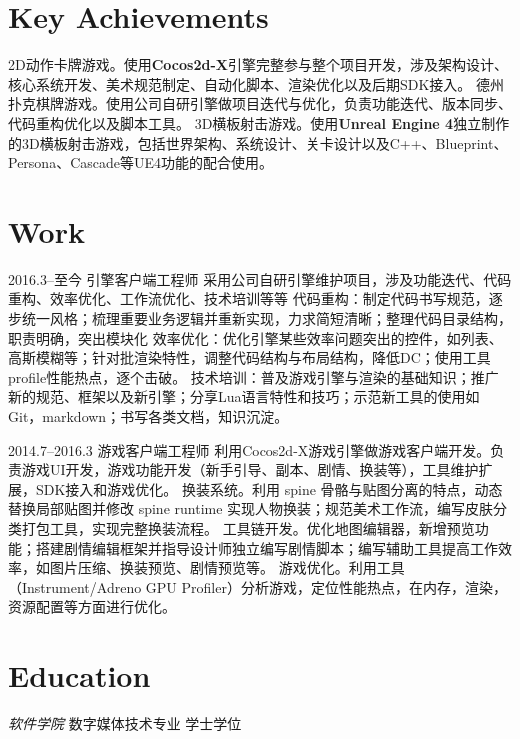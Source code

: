 \documentclass[full]{rvca}
\begin{document}
\subsection{}

\section{Key Achievements}

\achievements
{2D动作卡牌游戏。使用\textbf{Cocos2d-X}引擎完整参与整个项目开发，涉及架构设计、核心系统开发、美术规范制定、自动化脚本、渲染优化以及后期SDK接入。}
{德州扑克棋牌游戏。使用公司自研引擎做项目迭代与优化，负责功能迭代、版本同步、代码重构优化以及脚本工具。}
{3D横板射击游戏。使用\textbf{Unreal Engine 4}独立制作的3D横板射击游戏，包括世界架构、系统设计、关卡设计以及C++、Blueprint、Persona、Cascade等UE4功能的配合使用。}
{}

\section{Work}

{2016.3--至今}
{引擎客户端工程师}
{采用公司自研引擎维护项目，涉及功能迭代、代码重构、效率优化、工作流优化、技术培训等等}
{代码重构：制定代码书写规范，逐步统一风格；梳理重要业务逻辑并重新实现，力求简短清晰；整理代码目录结构，职责明确，突出模块化}
{效率优化：优化引擎某些效率问题突出的控件，如列表、高斯模糊等；针对批渲染特性，调整代码结构与布局结构，降低DC；使用工具profile性能热点，逐个击破。}
{技术培训：普及游戏引擎与渲染的基础知识；推广新的规范、框架以及新引擎；分享Lua语言特性和技巧；示范新工具的使用如Git，markdown；书写各类文档，知识沉淀。}
{}

{2014.7--2016.3}%
{游戏客户端工程师} %
{利用Cocos2d-X游戏引擎做游戏客户端开发。负责游戏UI开发，游戏功能开发（新手引导、副本、剧情、换装等），工具维护扩展，SDK接入和游戏优化。}%
{换装系统。利用 spine 骨骼与贴图分离的特点，动态替换局部贴图并修改 spine runtime 实现人物换装；规范美术工作流，编写皮肤分类打包工具，实现完整换装流程。}
{工具链开发。优化地图编辑器，新增预览功能；搭建剧情编辑框架并指导设计师独立编写剧情脚本；编写辅助工具提高工作效率，如图片压缩、换装预览、剧情预览等。}
{游戏优化。利用工具（Instrument/Adreno GPU Profiler）分析游戏，定位性能热点，在内存，渲染，资源配置等方面进行优化。}
{}

\section{Education}

{\emph{软件学院}}
{数字媒体技术专业} {学士学位}
\end{document}
